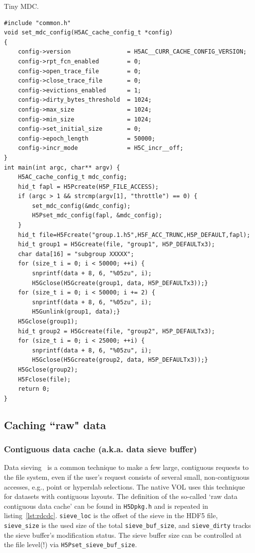 \begin{listing}
\centering
\caption{Tiny MDC.}
\label{lst:no-mdc}
\begin{verbatim}
#include "common.h"
void set_mdc_config(H5AC_cache_config_t *config)
{
    config->version                = H5AC__CURR_CACHE_CONFIG_VERSION;
    config->rpt_fcn_enabled        = 0;
    config->open_trace_file        = 0;
    config->close_trace_file       = 0;
    config->evictions_enabled      = 1;
    config->dirty_bytes_threshold  = 1024;
    config->max_size               = 1024;
    config->min_size               = 1024;
    config->set_initial_size       = 0;
    config->epoch_length           = 50000;
    config->incr_mode              = H5C_incr__off;
}
int main(int argc, char** argv) {
    H5AC_cache_config_t mdc_config;
    hid_t fapl = H5Pcreate(H5P_FILE_ACCESS);
    if (argc > 1 && strcmp(argv[1], "throttle") == 0) {
        set_mdc_config(&mdc_config);
        H5Pset_mdc_config(fapl, &mdc_config);
    }
    hid_t file=H5Fcreate("group.1.h5",H5F_ACC_TRUNC,H5P_DEFAULT,fapl);
    hid_t group1 = H5Gcreate(file, "group1", H5P_DEFAULTx3);
    char data[16] = "subgroup XXXXX";
    for (size_t i = 0; i < 50000; ++i) {
        snprintf(data + 8, 6, "%05zu", i);
        H5Gclose(H5Gcreate(group1, data, H5P_DEFAULTx3));}
    for (size_t i = 0; i < 50000; i += 2) {
        snprintf(data + 8, 6, "%05zu", i);
        H5Gunlink(group1, data);}
    H5Gclose(group1);
    hid_t group2 = H5Gcreate(file, "group2", H5P_DEFAULTx3);
    for (size_t i = 0; i < 25000; ++i) {
        snprintf(data + 8, 6, "%05zu", i);
        H5Gclose(H5Gcreate(group2, data, H5P_DEFAULTx3));}
    H5Gclose(group2);
    H5Fclose(file);
    return 0;
}
\end{verbatim}
\end{listing}


\subsection{Caching ``raw" data}

\subsubsection{Contiguous data cache (a.k.a. data sieve buffer)}

Data sieving~\cite{thakur1999} is a common technique to make a few large, contiguous requests to the file system, even if the user’s request consists of several small, non-contiguous accesses, e.g., point or hyperslab selections. The native VOL uses this technique for datasets with contiguous layouts. The definition of the so-called `raw data contiguous data cache' can be found in \texttt{H5Dpkg.h} and is repeated in listing~\ref{lst:rdcdc}. \texttt{sieve\_loc} is the offset of the sieve in the HDF5 file, \texttt{sieve\_size} is the used size of the total \texttt{sieve\_buf\_size}, and \texttt{sieve\_dirty} tracks the sieve buffer's modification status. The sieve buffer size can be controlled at the file level(!) via \texttt{H5Pset\_sieve\_buf\_size}.

